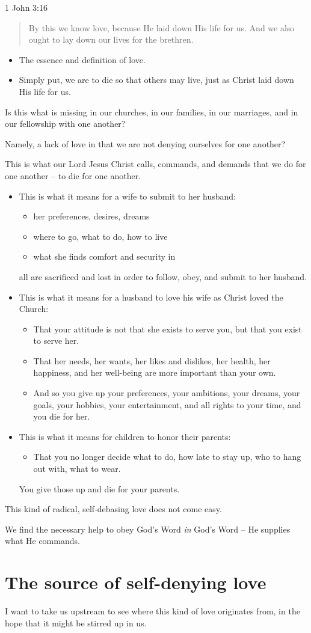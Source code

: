 \documentclass[12pt]{article}
\newcommand{\BI}{\begin{itemize}}
\newcommand{\EI}{\end{itemize}}
\newcommand{\I}{\item}
\newcommand{\Q}[1]{\begin{quote} #1 \end{quote}}
\begin{document}
\I  1 John 3:16
    \Q{ By this we know love, because He laid down His life for us.
        And we also ought to lay down our lives for the brethren.}
\BI \I  The essence and definition of love.
    \I  Simply put, we are to die so that others may live,
            just as Christ laid down His life for us. \EI

\I  Is this what is missing in our churches, in our families, in our marriages, 
        and in our fellowship with one another?

\I  Namely, a lack of love in that we are not denying ourselves for one another?

\I  This is what our Lord Jesus Christ 
        calls, commands, and demands that we do for one another
        -- to die for one another.
\BI \I  This is what it means for a wife to submit to her husband:
    \BI \I  her preferences, desires, dreams 
        \I  where to go, what to do, how to live 
        \I  what she finds comfort and security in \EI
            all are sacrificed and lost in order to
            follow, obey, and submit to her husband.
    \I  This is what it means for a husband 
            to love his wife as Christ loved the Church:
    \BI \I  That your attitude is not that she exists to serve you,
            but that you exist to serve her.
        \I  That her needs, her wants, her likes and dislikes,
            her health, her happiness, and her well-being
            are more important than your own.
        \I  And so you give up your preferences, your ambitions,
            your dreams, your goals, your hobbies, your entertainment,
            and all rights to your time, and you die for her. \EI 
    \I  This is what it means for children to honor their parents:
    \BI \I  That you no longer decide what to do, how late to stay up, 
                who to hang out with, what to wear. \EI
        You give those up and die for your parents. \EI 
               
\I  This kind of radical, self-debasing love does not come easy.

\I  We find the necessary help to obey God's Word \emph{in} God's Word --
        He supplies what He commands.
        

\section{The source of self-denying love}
\I  I want to take us upstream to see where this kind of love originates from,
    in the hope that it might be stirred up in us.
\end{document}
